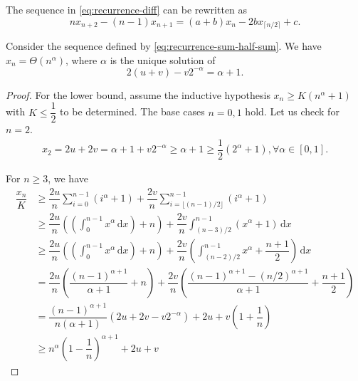 \begin{lemma}
  The sequence in \eqref{eq:recurrence-diff} can be rewritten as
  \begin{equation}
    nx_{n+2} - (n-1)x_{n+1} = (a+b)x_n - 2b x_{\lceil n/2\rceil} + c.
  \end{equation}
\end{lemma}

\begin{proposition}
  Consider the sequence defined by \eqref{eq:recurrence-sum-half-sum}. We have $x_n = \Theta(n^{\alpha})$, where $\alpha$ is the unique solution of
  $$2(u+v) - v2^{-\alpha} = \alpha+1.$$
\end{proposition}

\begin{proof}
  For the lower bound, assume the inductive hypothesis $x_n \ge K(n^{\alpha}+1)$ with $K\le \dfrac{1}{2}$ to be determined. The base cases $n=0,1$ hold. Let us check for $n=2$.
  \begin{align*}
    x_2 = 2u + 2v = \alpha+1+v2^{-\alpha} \ge \alpha+1 \ge \dfrac{1}{2}(2^{\alpha}+1), \forall \alpha \in [0,1].
  \end{align*}

  For $n\ge 3$, we have
  \begin{align*}
    \dfrac{x_{n}}{K}
     & \ge \dfrac{2u}{n}\sum_{i=0}^{n-1}(i^{\alpha}+1) + \dfrac{2v}{n}\sum_{i=\lfloor (n-1)/2 \rfloor}^{n-1}(i^{\alpha}+1)                                                         \\
     & \ge \dfrac{2u}{n}\left(\left(\int_{0}^{n-1}x^{\alpha}\,\mathrm{d}x\right)+n\right)  + \dfrac{2v}{n}\int_{(n-3)/2}^{n-1}(x^{\alpha}+1) \,\mathrm{d}x                         \\
     & \ge \dfrac{2u}{n}\left(\left(\int_{0}^{n-1}x^{\alpha}\,\mathrm{d}x\right)+n\right)  + \dfrac{2v}{n}\left(\int_{(n-2)/2}^{n-1}x^{\alpha}+\dfrac{n+1}{2}\right) \,\mathrm{d}x \\
     & = \dfrac{2u}{n}\left(\dfrac{(n-1)^{\alpha+1}}{\alpha+1} + n\right) + \dfrac{2v}{n}\left(\dfrac{(n-1)^{\alpha+1} - (n/2)^{\alpha+1}}{\alpha+1} + \dfrac{n+1}{2}\right)       \\
     & = \dfrac{(n-1)^{\alpha+1}}{n(\alpha+1)}\left(2u+2v - v2^{-\alpha}\right)+ 2u + v\left(1+\dfrac{1}{n}\right)                                                                 \\
     & \ge n^{\alpha}\left(1-\dfrac{1}{n}\right)^{\alpha+1} + 2u+v
  \end{align*}


\end{proof}
